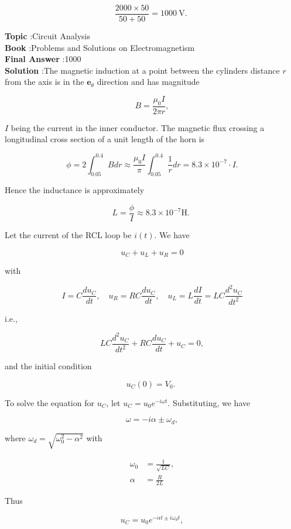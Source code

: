 \documentclass[10pt]{article}
\begin{document}
$$
\frac{2000 \times 50}{50+50}=1000 \mathrm{~V} \text {. }
$$

\textbf{Topic} :Circuit Analysis\\
\textbf{Book} :Problems and Solutions on Electromagnetism\\
\textbf{Final Answer} :1000 \\


\textbf{Solution} :The magnetic induction at a point between the cylinders distance $r$ from the axis is in the $\mathbf{e}_{\theta}$ direction and has magnitude

$$
B=\frac{\mu_{0} I}{2 \pi r},
$$

$I$ being the current in the inner conductor. The magnetic flux crossing a longitudinal cross section of a unit length of the horn is

$$
\phi=2 \int_{0.05}^{0.4} B d r \approx \frac{\mu_{0} I}{\pi} \int_{0.05}^{0.4} \frac{1}{r} d r=8.3 \times 10^{-7} \cdot I .
$$

Hence the inductance is approximately

$$
L=\frac{\phi}{I} \approx 8.3 \times 10^{-7} \mathrm{H} \text {. }
$$

 Let the current of the RCL loop be $i(t)$. We have

$$
u_{C}+u_{L}+u_{R}=0
$$

with

$$
I=C \frac{d u_{C}}{d t}, \quad u_{R}=R C \frac{d u_{C}}{d t}, \quad u_{L}=L \frac{d I}{d t}=L C \frac{d^{2} u_{C}}{d t^{2}}
$$

i.e.,

$$
L C \frac{d^{2} u_{C}}{d t^{2}}+R C \frac{d u_{C}}{d t}+u_{C}=0,
$$

and the initial condition

$$
u_{C}(0)=V_{0} \text {. }
$$

To solve the equation for $u_{C}$, let $u_{C}=u_{0} e^{-i \omega t}$. Substituting, we have

$$
\omega=-i \alpha \pm \omega_{d},
$$

where $\omega_{d}=\sqrt{\omega_{0}^{2}-\alpha^{2}}$ with

$$
\begin{aligned}
\omega_{0} &=\frac{1}{\sqrt{L C}}, \\
\alpha &=\frac{R}{2 L}
\end{aligned}
$$

Thus

$$
u_{C}=u_{0} e^{-\alpha t \pm i \omega_{d} t},
$$
\end{document}
